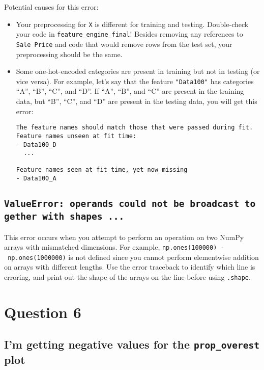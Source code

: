 \documentclass[
  letterpaper,
  DIV=11,
  numbers=noendperiod]{scrreprt}
\begin{document}
Potential causes for this error:

\begin{itemize}
\item
  Your preprocessing for \texttt{X} is different for training and
  testing. Double-check your code in \texttt{feature\_engine\_final}!
  Besides removing any references to
  \texttt{\textquotesingle{}Sale\ Price\textquotesingle{}} and code that
  would remove rows from the test set, your preprocessing should be the
  same.
\item
  Some one-hot-encoded categories are present in training but not in
  testing (or vice versa). For example, let's say that the feature
  \texttt{"Data100"} has categories ``A'', ``B'', ``C'', and ``D''. If
  ``A'', ``B'', and ``C'' are present in the training data, but ``B'',
  ``C'', and ``D'' are present in the testing data, you will get this
  error:

\begin{verbatim}
The feature names should match those that were passed during fit. Feature names unseen at fit time: 
- Data100_D
  ...

Feature names seen at fit time, yet now missing
- Data100_A
\end{verbatim}
\end{itemize}

\subsection{\texorpdfstring{\texttt{ValueError:\ operands\ could\ not\ be\ broadcast\ together\ with\ shapes\ ...}}{ValueError: operands could not be broadcast together with shapes ...}}\label{valueerror-operands-could-not-be-broadcast-together-with-shapes-...}

This error occurs when you attempt to perform an operation on two NumPy
arrays with mismatched dimensions. For example,
\texttt{np.ones(100000)\ -\ np.ones(1000000)} is not defined since you
cannot perform elementwise addition on arrays with different lengths.
Use the error traceback to identify which line is erroring, and print
out the shape of the arrays on the line before using \texttt{.shape}.

\section{Question 6}\label{question-6-1}

\subsection{\texorpdfstring{I'm getting negative values for the
\texttt{prop\_overest}
plot}{I'm getting negative values for the prop\_overest plot}}\label{im-getting-negative-values-for-the-prop_overest-plot}
\end{document}
